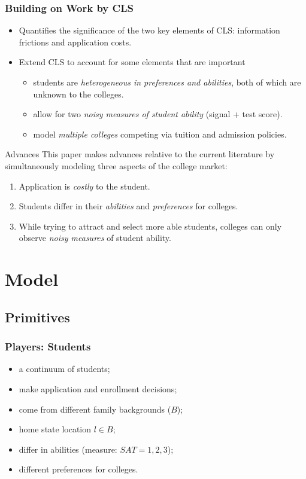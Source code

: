 \documentclass[10pt]{beamer}
\begin{document}
\begin{frame}[c]\frametitle{Building on Work by CLS}
\begin{itemize}
    \item Quantifies the significance of the two key elements of CLS: \alert{information frictions} and \alert{application costs}.
    \item Extend CLS to account for some elements that are important
    \begin{itemize}
        \item students are \textit{heterogeneous in preferences and abilities}, both of which are unknown to the colleges.
        \item allow for two \textit{noisy measures of student ability} (signal + test score).
        \item  model \textit{multiple colleges} competing via tuition and admission policies.
    \end{itemize}

\end{itemize}

\end{frame}

\begin{frame}{Advances}
This paper makes \alert{advances} relative to the current literature by simultaneously modeling three aspects of the college market:
\begin{enumerate}
    \item  Application is \textit{costly} to the student.
    \item  Students differ in their \textit{abilities} and \textit{preferences} for colleges.
    \item While trying to attract and select more able students, colleges can only observe \textit{noisy measures} of student ability.
\end{enumerate}

\end{frame}


\section{Model}
\subsection{Primitives}
\begin{frame}[c]\frametitle{Players: Students}

\begin{itemize}
    \item a continuum of students;
    \item make application and enrollment decisions;
    \item come from different family backgrounds ($B$);
    \item home state location $l\in B$;
    \item differ in abilities (measure: $SAT = 1,2,3$);
    \item different preferences for colleges.
\end{itemize}



\end{frame}
\end{document}
